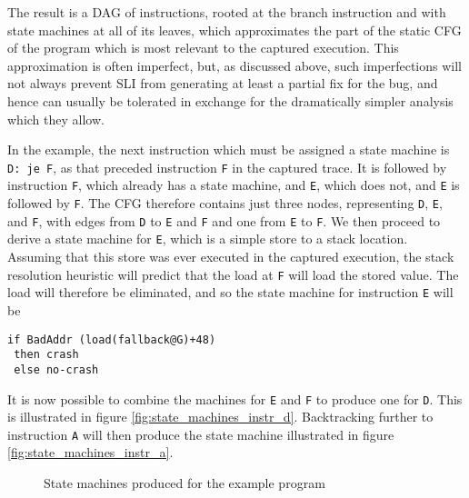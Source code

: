 \documentclass[10pt,twocolumn,preprint,natbib,authoryear]{sigplanconf}
\begin{document}
The result is a DAG of instructions, rooted at the branch instruction
and with state machines at all of its leaves, which approximates the
part of the static CFG of the program which is most relevant to the
captured execution.  This approximation is often imperfect, but, as
discussed above, such imperfections will not always prevent SLI from
generating at least a partial fix for the bug, and hence can usually
be tolerated in exchange for the dramatically simpler analysis which
they allow.

In the example, the next instruction which must be assigned a state
machine is \verb|D: je F|, as that preceded instruction \verb|F| in
the captured trace.  It is followed by instruction \verb|F|, which
already has a state machine, and \verb|E|, which does not, and
\verb|E| is followed by \verb|F|.  The CFG therefore contains just
three nodes, representing \verb|D|, \verb|E|, and \verb|F|, with edges
from \verb|D| to \verb|E| and \verb|F| and one from \verb|E| to
\verb|F|.  We then proceed to derive a state machine for \verb|E|,
which is a simple store to a stack location.  Assuming that this store
was ever executed in the captured execution, the stack resolution
heuristic will predict that the load at \verb|F| will load the stored
value.  The load will therefore be eliminated, and so the state
machine for instruction \verb|E| will be

\begin{verbatim}
if BadAddr (load(fallback@G)+48)
 then crash
 else no-crash
\end{verbatim}

\noindent
It is now possible to combine the machines for \verb|E| and \verb|F|
to produce one for \verb|D|.  This is illustrated in figure
\ref{fig:state_machines_instr_d}.  Backtracking further to instruction
\verb|A| will then produce the state machine illustrated in figure
\ref{fig:state_machines_instr_a}.

\begin{figure*}
\caption{State machines produced for the example program}
\end{figure*}
\end{document}
